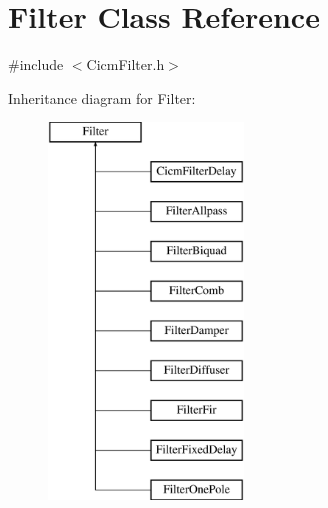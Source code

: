 \hypertarget{class_filter}{\section{Filter Class Reference}
\label{class_filter}
}


{\ttfamily \#include $<$Cicm\-Filter.\-h$>$}

Inheritance diagram for Filter\-:\begin{figure}[H]
\begin{center}
\leavevmode
\includegraphics[height=10.000000cm]{class_filter}
\end{center}
\end{figure}
